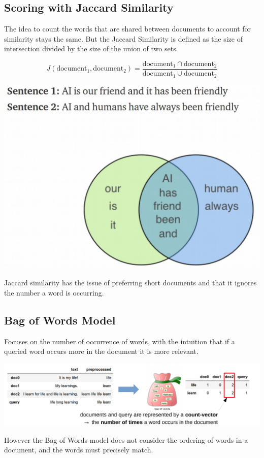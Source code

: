 \documentclass[11pt]{article}
\begin{document}
\subsection{Scoring with Jaccard Similarity}
The idea to count the words that are shared between documents to account for similarity stays the same. But the Jaccard Similarity is defined as the size of intersection divided by the size of the union of two sets.

\noindent
\begin{minipage}{0.6\linewidth}
	\begin{equation*}
	J(\text{document}_1,\text{document}_2) = \frac{\text{document}_1\cap\text{document}_2}{\text{document}_1\cup\text{document}_2}
	\end{equation*}
\end{minipage}
\begin{minipage}{0.4\linewidth}
	\begin{center}
		\includegraphics[width=0.9\linewidth]{img/jaccard_set}
	\end{center}
\end{minipage}
Jaccard similarity has the issue of preferring short documents and that it ignores the number a word is occurring.

\subsection{Bag of Words Model}
Focuses on the number of occurrence of words, with the intuition that if a queried word occurs more in the document it is more relevant.
\begin{center}
	\includegraphics[width=0.8\linewidth]{img/bagofwords_model}
\end{center}
However the Bag of Words model does not consider the ordering of words in a document, and the words must precisely match.
\end{document}
